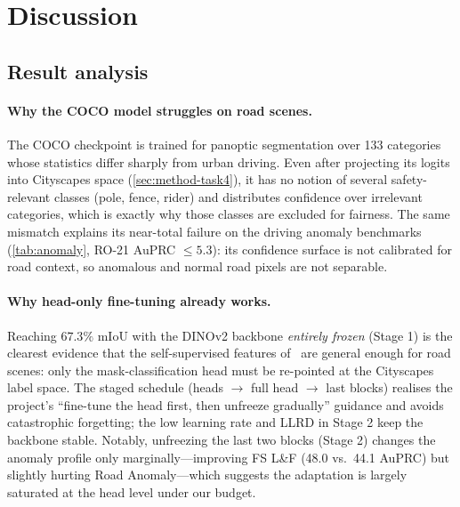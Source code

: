\section{Discussion}
\label{sec:discussion}

\subsection{Result analysis}
\paragraph{Why the COCO model struggles on road scenes.}
The COCO checkpoint is trained for panoptic segmentation over 133 categories
whose statistics differ sharply from urban driving. Even after projecting its
logits into Cityscapes space (\cref{sec:method-task4}), it has no notion of
several safety-relevant classes (pole, fence, rider) and distributes
confidence over irrelevant categories, which is exactly why those classes are
excluded for fairness. The same mismatch explains its near-total failure on
the driving anomaly benchmarks (\cref{tab:anomaly}, RO-21 AuPRC $\le5.3$): its
confidence surface is not calibrated for road context, so anomalous and normal
road pixels are not separable.

\paragraph{Why head-only fine-tuning already works.}
Reaching $67.3\%$ mIoU with the DINOv2 backbone \emph{entirely frozen}
(Stage 1) is the clearest evidence that the self-supervised features
of~\cite{dinov2} are general enough for road scenes: only the
mask-classification head must be re-pointed at the Cityscapes label space.
The staged schedule (heads $\rightarrow$ full head $\rightarrow$ last blocks)
realises the project's ``fine-tune the head first, then unfreeze gradually''
guidance and avoids catastrophic forgetting; the low learning rate and LLRD in
Stage 2 keep the backbone stable. Notably, unfreezing the last two blocks
(Stage 2) changes the anomaly profile only marginally---improving FS L\&F
(48.0 vs.\ 44.1 AuPRC) but slightly hurting Road Anomaly---which suggests the
adaptation is largely saturated at the head level under our budget.

